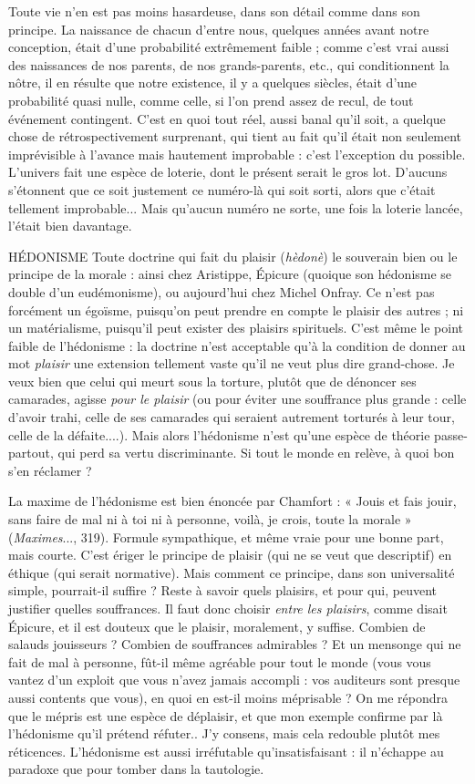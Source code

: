 Toute vie n’en est pas moins hasardeuse, dans son détail comme dans son
principe. La naissance de chacun d’entre nous, quelques années avant notre
conception, était d’une probabilité extrêmement faible ; comme c’est vrai aussi
des naissances de nos parents, de nos grands-parents, etc., qui conditionnent la
nôtre, il en résulte que notre existence, il y a quelques siècles, était d’une probabilité
quasi nulle, comme celle, si l’on prend assez de recul, de tout événement
contingent. C’est en quoi tout réel, aussi banal qu’il soit, a quelque chose
de rétrospectivement surprenant, qui tient au fait qu’il était non seulement
imprévisible à l’avance mais hautement improbable : c’est l’exception du possible.
L'univers fait une espèce de loterie, dont le présent serait le gros lot.
D’aucuns s’étonnent que ce soit justement ce numéro-là qui soit sorti, alors
que c'était tellement improbable... Mais qu'aucun numéro ne sorte, une fois la
loterie lancée, l'était bien davantage.

HÉDONISME Toute doctrine qui fait du plaisir ({\it hèdonè}) le souverain bien
ou le principe de la morale : ainsi chez Aristippe, Épicure
(quoique son hédonisme se double d’un eudémonisme), ou aujourd’hui chez
Michel Onfray. Ce n’est pas forcément un égoïsme, puisqu'on peut prendre en
compte le plaisir des autres ; ni un matérialisme, puisqu'il peut exister des plaisirs
spirituels. C’est même le point faible de l’hédonisme : la doctrine n’est
acceptable qu’à la condition de donner au mot {\it plaisir} une extension tellement
vaste qu’il ne veut plus dire grand-chose. Je veux bien que celui qui meurt sous
la torture, plutôt que de dénoncer ses camarades, agisse {\it pour le plaisir} (ou pour
éviter une souffrance plus grande : celle d’avoir trahi, celle de ses camarades qui
seraient autrement torturés à leur tour, celle de la défaite....). Mais alors l’hédonisme
n’est qu’une espèce de théorie passe-partout, qui perd sa vertu discriminante.
Si tout le monde en relève, à quoi bon s’en réclamer ?

La maxime de l’hédonisme est bien énoncée par Chamfort : « Jouis et fais
jouir, sans faire de mal ni à toi ni à personne, voilà, je crois, toute la morale »
({\it Maximes}..., 319). Formule sympathique, et même vraie pour une bonne part,
mais courte. C’est ériger le principe de plaisir (qui ne se veut que descriptif) en
éthique (qui serait normative). Mais comment ce principe, dans son universalité
simple, pourrait-il suffire ? Reste à savoir quels plaisirs, et pour qui, peuvent
justifier quelles souffrances. Il faut donc choisir {\it entre les plaisirs}, comme disait
Épicure, et il est douteux que le plaisir, moralement, y suffise. Combien de
salauds jouisseurs ? Combien de souffrances admirables ? Et un mensonge qui
ne fait de mal à personne, fût-il même agréable pour tout le monde (vous vous
vantez d’un exploit que vous n’avez jamais accompli : vos auditeurs sont
presque aussi contents que vous), en quoi en est-il moins méprisable ? On me
répondra que le mépris est une espèce de déplaisir, et que mon exemple
confirme par là l’hédonisme qu’il prétend réfuter.. J'y consens, mais cela
redouble plutôt mes réticences. L’hédonisme est aussi irréfutable qu’insatisfaisant :
il n'échappe au paradoxe que pour tomber dans la tautologie.


